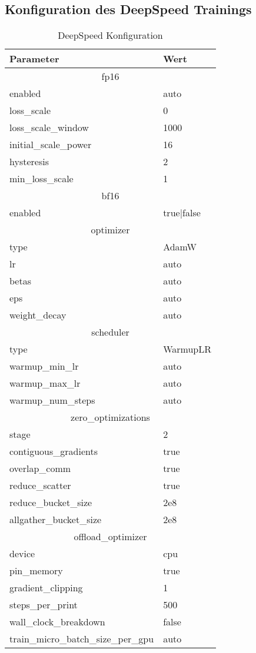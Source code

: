 \subsection{Konfiguration des DeepSpeed Trainings}\label{sec:deepspeed-config}
\begin{table}
    \centering
    \begin{tabular}{ll}
        \toprule
        \textbf{Parameter}&\textbf{Wert}\\
        \midrule
        \multicolumn{2}{c}{fp16}\\
        enabled&auto\\
        loss\_scale&0\\
        loss\_scale\_window&1000\\
        initial\_scale\_power&16\\
        hysteresis&2\\
        min\_loss\_scale&1\\
        \midrule
        \multicolumn{2}{c}{bf16}\\
        enabled&true|false\\
        \midrule
        \multicolumn{2}{c}{optimizer}\\
        type&AdamW\\
        lr&auto\\
        betas&auto\\
        eps&auto\\
        weight\_decay&auto\\
        \midrule
        \multicolumn{2}{c}{scheduler}\\
        type&WarmupLR\\
        warmup\_min\_lr&auto\\
        warmup\_max\_lr&auto\\
        warmup\_num\_steps&auto\\
        \midrule
        \multicolumn{2}{c}{zero\_optimizations}\\
        stage&2\\
        contiguous\_gradients&true\\
        overlap\_comm&true\\
        reduce\_scatter&true\\
        reduce\_bucket\_size&2e8\\
        allgather\_bucket\_size&2e8\\
        \midrule
        \multicolumn{2}{c}{offload\_optimizer}\\
        device&cpu\\
        pin\_memory&true\\
        \midrule
        gradient\_clipping&1\\
        steps\_per\_print&500\\
        wall\_clock\_breakdown&false\\
        train\_micro\_batch\_size\_per\_gpu&auto\\
    \end{tabular}
    \caption{DeepSpeed Konfiguration}\label{tab:deepspeed-config}
\end{table}

